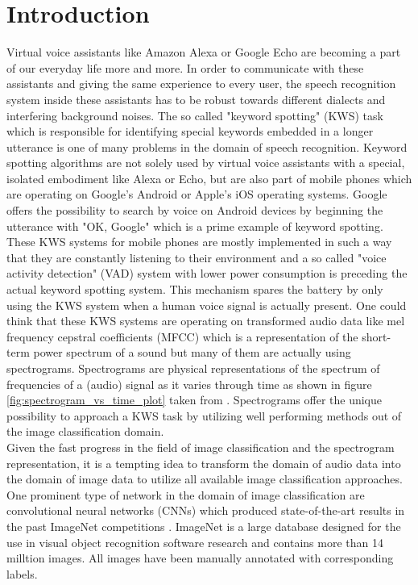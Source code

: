 \documentclass{article}
\theoremstyle{definition}
\theoremstyle{remark}
\begin{document}
\tableofcontents

\newpage

\section{Introduction}

Virtual voice assistants like Amazon Alexa or Google Echo are becoming a part of our everyday life more and more. In order to communicate with these assistants and giving the same experience to every user, the speech recognition system inside these assistants has to be robust towards different dialects and interfering background noises. The so called "keyword spotting" (KWS) task which is responsible for identifying special keywords embedded in a longer utterance is one of many problems in the domain of speech recognition. Keyword spotting algorithms are not solely used by virtual voice assistants with a special, isolated embodiment like Alexa or Echo, but are also part of mobile phones which are operating on Google's Android or Apple's iOS operating systems. Google offers the possibility to search by voice on Android devices by beginning the utterance with "OK, Google" \cite{schalkwyk2010your} which is a prime example of keyword spotting. These KWS systems for mobile phones are mostly implemented in such a way that they are constantly listening to their environment and a so called "voice activity detection" (VAD) system with lower power consumption is preceding the actual keyword spotting system. This mechanism spares the battery by only using the KWS system when a human voice signal is actually present. One could think that these KWS systems are operating on transformed audio data like mel frequency cepstral coefficients (MFCC) which is a representation of the short-term power spectrum of a sound but many of them are actually using spectrograms. Spectrograms are physical representations of the spectrum of frequencies of a (audio) signal as it varies through time as shown in figure \ref{fig:spectrogram_vs_time_plot} taken from \cite{gouda2018speech}. Spectrograms offer the unique possibility to approach a KWS task by utilizing well performing methods out of the image classification domain.\\
Given the fast progress in the field of image classification and the spectrogram representation, it is a tempting idea to transform the domain of audio data into the domain of image data to utilize all available image classification approaches. One prominent type of network in the domain of image classification are convolutional neural networks (CNNs) which produced state-of-the-art results in the past ImageNet competitions \cite{deng2009imagenet} \cite{krizhevsky2012imagenet}. ImageNet is a large database designed for the use in visual object recognition software research and contains more than 14 milltion images. All images have been manually annotated with corresponding labels.\\
\end{document}
